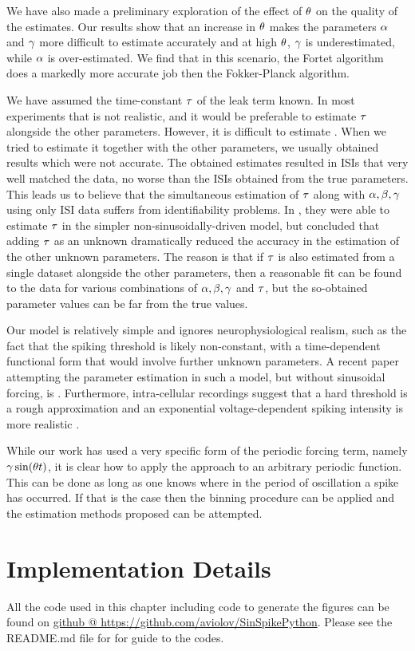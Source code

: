 We have also made a preliminary exploration of the effect of ${ \theta}$ on the
quality of the estimates. Our results show that an increase in ${ \theta}$ makes the
parameters $\alpha$ and ${\gamma }$ more difficult to estimate accurately and at high
${ \theta}$, ${\gamma }$ is underestimated, while $\alpha$ is over-estimated. We find that in
this scenario, the Fortet algorithm does a markedly more accurate job then the
Fokker-Planck algorithm.
 
We have assumed  the time-constant ${\tau}$ of the leak term known. In most
experiments that is not realistic, and it would be preferable to estimate ${\tau}$
alongside the other parameters. However, it is difficult to estimate
\cite{DitlevsenLansky212}. When we tried to estimate it together with the other
parameters, we usually obtained results which were not accurate. The obtained
estimates resulted in ISIs that very well matched the data, no worse than the
ISIs obtained from the true parameters. This leads us to believe that the
simultaneous estimation of ${\tau}$ along with ${\alpha,\beta,{\gamma } }$ using only ISI data suffers
from identifiability problems. In \cite{MullowneyIyengar2008}, they were able to
estimate ${\tau}$ in the simpler non-sinusoidally-driven model, but concluded that
adding ${\tau}$ as an unknown dramatically reduced the accuracy in the estimation of
the other unknown parameters. The reason is that if ${\tau}$ is also estimated from
a single dataset alongside the other parameters, then a reasonable fit can be
found to the data for various combinations of ${\alpha,\beta,{\gamma } }$ and ${\tau}$, but the so-obtained
parameter values can be far from the true values.

Our model is relatively simple and ignores neurophysiological realism, such as
the fact that the spiking threshold is likely non-constant, with a
time-dependent functional form that would involve further unknown parameters. A
recent paper attempting the parameter estimation in such a model, but without
sinusoidal forcing, is \cite{Dong2011}. Furthermore, intra-cellular recordings
suggest that a hard threshold is a rough approximation and an exponential
voltage-dependent spiking intensity is more realistic \cite{Jahn2011}.

While our work has used a very specific form of the periodic forcing term,
namely ${\gamma } \sin({ \theta} t)$,  it is clear how to apply the approach to an arbitrary
periodic function. This can be done as long as one knows where in the period of
oscillation a spike has occurred. If that is the case then the binning procedure
can be applied and the estimation methods proposed can be attempted. 


\section*{Implementation Details}
All the code used in this chapter including code to generate the figures
can be found on
\href{https://github.com/aviolov/SinSpikePython}{github @
https://github.com/aviolov/SinSpikePython}. Please see the README.md file for
for guide to the codes.
